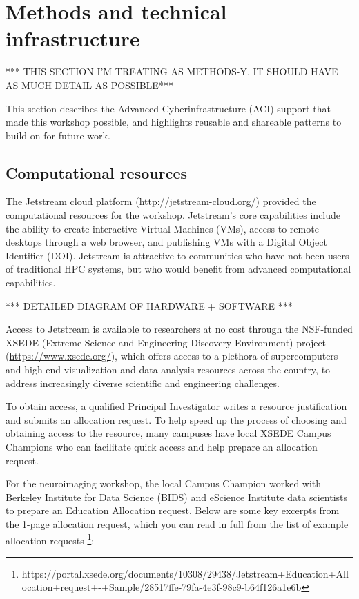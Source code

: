 \section{Methods and technical infrastructure}\label{sec:methods}

*** THIS SECTION I'M TREATING AS METHODS-Y, IT SHOULD HAVE AS MUCH DETAIL AS POSSIBLE***

This section describes the Advanced Cyberinfrastructure (ACI) support that made
this workshop possible, and highlights reusable and shareable patterns to build
on for future work.

\subsection{Computational resources}

The Jetstream cloud platform (\url{http://jetstream-cloud.org/}) provided the
computational resources for the workshop. Jetstream's core capabilities include
the ability to create interactive Virtual Machines (VMs), access to remote
desktops through a web browser, and publishing VMs with a Digital Object
Identifier (DOI). Jetstream is
attractive to communities who have not been users of traditional HPC systems,
but who would benefit from advanced computational capabilities.

*** DETAILED DIAGRAM OF HARDWARE + SOFTWARE ***

Access to Jetstream is available to researchers at no cost through the
NSF-funded XSEDE (Extreme Science and Engineering Discovery Environment) project
(\url{https://www.xsede.org/}), which offers access to a plethora of
supercomputers and high-end visualization and data-analysis resources across the
country, to address increasingly diverse scientific and engineering challenges.

To obtain access, a qualified Principal Investigator writes a resource justification and submits an
allocation request. To help speed up the process of choosing and obtaining
access to the resource, many campuses have local XSEDE Campus Champions who can
facilitate quick access and help prepare an allocation request.

For the neuroimaging workshop, the local Campus Champion worked with Berkeley
Institute for Data Science (BIDS) and
eScience Institute data scientists to prepare an Education Allocation request. Below are
some key excerpts from the 1-page allocation request, which you can read in full
from the list of example allocation requests \footnote{https://portal.xsede.org/documents/10308/29438/Jetstream+Education+Allocation+request+-+Sample/28517ffe-79fa-4e3f-98c9-b64f126a1e6b}:

